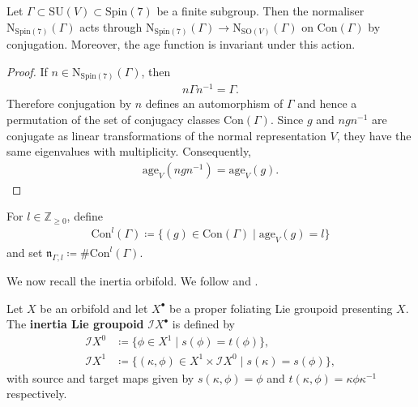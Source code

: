 \documentclass[psamsfonts]{amsart}
\theoremstyle{plain}
\theoremstyle{definition}{
\newtheorem{defi}{Definition}[section]
\newtheorem{ass}{Assumption}
\newtheorem*{nota}{Notation}}
\theoremstyle{remark}{
\newtheorem{rem}{Remark}
\newtheorem{ex}{Example}}
\theoremstyle{plain}{
\newtheorem{thm}{Theorem}[section]
\newtheorem{lem}{Lemma}[section]
\newtheorem{cor}{Corollary}[section]
\newtheorem{prop}{Proposition}[section]
\newtheorem{con}{Conjecture}[section]}
\newcommand{\m}[1]{{\mathrm{#1}}}
\begin{document}
\begin{lem}
Let $\Gamma\subset \m{SU}(V)\subset \m{Spin}(7)$ be a finite subgroup. Then
the normaliser $\m{N}_{\m{Spin}(7)}(\Gamma)$ acts through $\m{N}_{\m{Spin}(7)}(\Gamma)\rightarrow \m{N}_{\m{SO}(V)}(\Gamma)$ on $\m{Con}(\Gamma)$ by
conjugation. Moreover, the age function is invariant under this action.
\end{lem}

\begin{proof}
If $n\in \m{N}_{\m{Spin}(7)}(\Gamma)$, then
\begin{align*}
        n\Gamma n^{-1}=\Gamma.
\end{align*}
Therefore conjugation by $n$ defines an automorphism of $\Gamma$ and hence a
permutation of the set of conjugacy classes $\m{Con}(\Gamma)$. Since $g$ and
$ngn^{-1}$ are conjugate as linear transformations of the normal representation
$V$, they have the same eigenvalues with multiplicity. Consequently,
\begin{align*}
        \m{age}_V(ngn^{-1})=\m{age}_V(g).
\end{align*}
\end{proof}

\begin{defi}
For $l\in\mathbb{Z}_{\geq 0}$, define
\begin{align*}
        \m{Con}^l(\Gamma)
        \coloneqq
        \{(g)\in \m{Con}(\Gamma)\mid \m{age}_V(g)=l\}
\end{align*}
and set $\mathfrak{n}_{\Gamma,l}\coloneqq\#\m{Con}^l(\Gamma).$
\end{defi}

We now recall the inertia orbifold. We follow
\cite[Sec. 4]{adem2007orbifolds} and \cite[Chap. 6.4]{moerdijk2002orbifolds}.

\begin{defi}
Let $X$ be an orbifold and let $X^\bullet$ be a proper foliating Lie groupoid
presenting $X$. The \textbf{inertia Lie groupoid}
$\mathcal{I}X^\bullet$ is defined by
\begin{align*}
        \mathcal{I}X^0
        &\coloneqq
        \{\phi\in X^1\mid s(\phi)=t(\phi)\},\\
        \mathcal{I}X^1
        &\coloneqq
        \{(\kappa,\phi)\in X^1\times \mathcal{I}X^0
        \mid s(\kappa)=s(\phi)\},
\end{align*}
with source and target maps given by $s(\kappa,\phi)=\phi$ and $t(\kappa,\phi)=\kappa\phi\kappa^{-1}$ respectively.
\end{defi}
\end{document}
